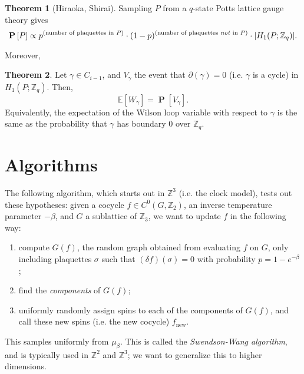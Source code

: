 \documentclass[11pt]{article}
\theoremstyle{definition}
\newtheorem*{theorem*}{Theorem}
\newcommand{\Z}{\mathbb{Z}}			%
\newcommand{\probability}[1]{\operatorname{\mathbf P}\left[#1\right]}	%
\newcommand{\expectation}[1]{\mathbb{E}\left[#1\right]}			%
\begin{document}
 		\begin{theorem*}[Hiraoka, Shirai]
 			Sampling $P$ from a $q$-state Potts lattice gauge theory gives $$ \probability P \propto p^{(\text{number of plaquettes in } P)} \cdot (1-p)^{(\text{number of plaquettes \textit{not} in }P)} \cdot |H_1(P; \Z_q)|. $$
 		\end{theorem*}
 		
 		Moreover, 
 		
 		\begin{theorem*}
 			Let $\gamma \in C_{i-1}$, and $V_\gamma$ the event that $\partial(\gamma) = 0$ (i.e. $\gamma$ is a cycle) in $H_1(P;\Z_q)$. Then, $$ \expectation{W_\gamma} = \probability{V_\gamma}. $$ Equivalently, the expectation of the Wilson loop variable with respect to $\gamma$ is the same as the probability that $\gamma$ has boundary $0$ over $\Z_q$.
 		\end{theorem*}
 		
 	\section*{Algorithms}
 		The following algorithm, which starts out in $\Z^3$ (i.e. the clock model), tests out these hypotheses: given a cocycle $f \in C^0(G, \Z_2)$, an inverse temperature parameter $-\beta$, and $G$ a sublattice of $\Z_3$, we want to update $f$ in the following way:
 		
 		\begin{enumerate}
 			\item compute $G(f)$, the random graph obtained from evaluating $f$ on $G$, only including plaquettes $\sigma$ such that $(\delta f)(\sigma) = 0$ with probability $p = 1-e^{-\beta}$;
 			\item find the \textit{components} of $G(f)$;
 			\item uniformly randomly assign spins to each of the components of $G(f)$, and call these new spins (i.e. the new cocycle) $f_{\text{new}}$.
 		\end{enumerate}
 		
 		This samples uniformly from $\mu_\beta$. This is called the \textit{Swendson-Wang algorithm}, and is typically used in $\Z^2$ and $\Z^3$; we want to generalize this to higher dimensions.
\end{document}
